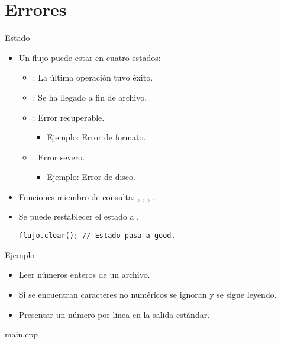 \section{Errores}

\begin{frame}[fragile]{Estado}
\begin{itemize}
  \item Un flujo puede estar en cuatro estados:
    \begin{itemize}
      \item {}: La última operación tuvo éxito.
      \item {}: Se ha llegado a fin de archivo.
      \item {}: Error recuperable.
        \begin{itemize}
          \item \alert{Ejemplo}: Error de formato.
        \end{itemize}
      \item {}: Error severo.
        \begin{itemize}
          \item \alert{Ejemplo}: Error de disco.
        \end{itemize}
    \end{itemize}
  \item Funciones miembro de consulta: , , , .
  \item Se puede restablecer el estado a .
\begin{lstlisting}
flujo.clear(); // Estado pasa a good.
\end{lstlisting}
\end{itemize}
\end{frame}

\begin{frame}{Ejemplo}
\begin{itemize}
  \item Leer números enteros de un archivo.
  \item Si se encuentran caracteres no numéricos se ignoran y se sigue leyendo.
  \item Presentar un número por línea en la salida estándar.
\end{itemize}
\end{frame}

\begin{frame}
\begin{block}{main.cpp}

\end{block}
\end{frame}

